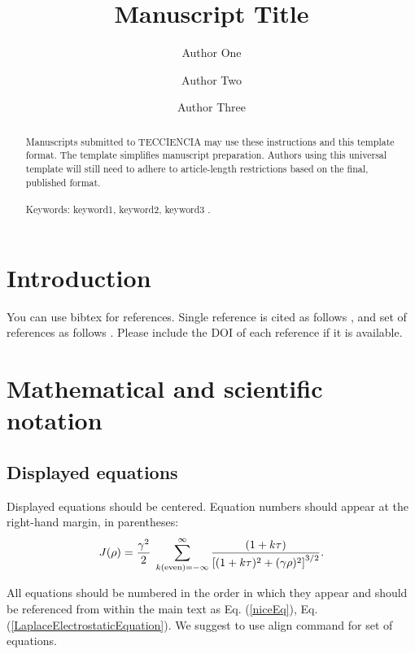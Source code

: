 \documentclass[10pt]{article}
\title{Manuscript Title}
\author[1]{Author One}
\author[2]{Author Two}
\author[3]{Author Three}
\affil[1]{Affiliation One, City-Country}
\affil[2]{Affiliation Two, City-Country}
\affil[3]{Affiliation Three, City-Country}
\begin{document}
    \maketitle

\begin{abstract}
Manuscripts submitted to TECCIENCIA may use these instructions and this template format. The template simplifies manuscript preparation. Authors using this universal template will still need to adhere to article-length restrictions based on the final, published format. \blindtext
\\\\Keywords: keyword1, keyword2, keyword3 .  
\end{abstract}

\section{Introduction}
You can use bibtex for references. Single reference is cited as follows \cite{chiaverini2005surface}, and set of references as follows \cite{leibfried2005surface,seidelin2006microfabricated,daniilidis2011fabrication}. Please include the DOI of each reference if it is available.

\blindtext

\section{Mathematical and scientific notation}

\subsection{Displayed equations} Displayed equations should be centered.
Equation numbers should appear at the right-hand margin, in
parentheses:
\begin{equation}
J(\rho) =
 \frac{\gamma^2}{2} \; \sum_{k({\rm even}) = -\infty}^{\infty}
	\frac{(1 + k \tau)}{ \left[ (1 + k \tau)^2 + (\gamma  \rho)^2  \right]^{3/2} }.
	\label{niceEq}
\end{equation}

All equations should be numbered in the order in which they appear
and should be referenced  from within the main text as Eq. (\ref{niceEq}),
Eq. (\ref{LaplaceElectrostaticEquation}). We suggest to use align command for set of equations.
\end{document}
